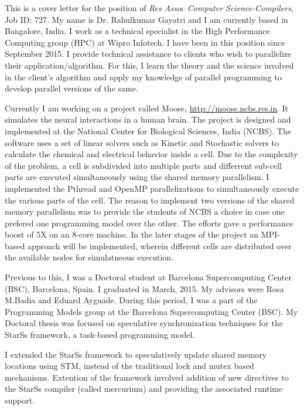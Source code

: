\documentclass[10pt,stdletter,dateno]{newlfm}
\begin{document}
\begin{newlfm}
	   This is a cover letter for the position of {\it Res Assoc Computer Science-Compilers}, Job ID: 727. 
	   My name is Dr. Rahulkumar Gayatri and I am currently based in Bangalore, India. 
	   I work as a technical specialist in the High Performance Computing group (HPC) at Wipro Infotech. 
	   I have been in this position since September 2015. 
	   I provide technical assistance to clients who wish to parallelize their application/algorithm.
	   For this, I learn the theory and the science involved in the client's algorithm and apply my knowledge of parallel programming to develop parallel versions of the same.
%	   
	   \par
	   Currently I am working on a project called Moose, \href{url}{http://moose.ncbs.res.in}.
	   It simulates the neural interactions in a human brain. 
	   The project is designed and implemented at the National Center for Biological Sciences, India (NCBS). 
	   The software uses a set of linear solvers such as Kinetic and Stochastic solvers to calculate the chemical and electrical behavior inside a cell. 
	   Due to the complexity of the problem, a cell is subdivided into multiple parts and differrent sub-cell parts are executed simultaneously using the shared memory parallelism. 
	   I implemented the Pthread and OpenMP parallelizations to simultaneously execute the various parts of the cell. 
	   The reason to implement two versions of the shared memory parallelism was to provide the students of NCBS a choice in case one prefered one programming model over the other.
	   The efforts gave a performance boost of 5X on an 8-core machine.
	   In the later stages of the project an MPI-based approach will be implemented, wherein different cells are distributed over the available nodes for simulatneous execution.
%	   
	   \par
	   Previous to this, I was a Doctoral student at Barcelona Supercomputing Center (BSC), Barcelona, Spain. I graduated in March, 2015. 
	   My advisors were Rosa M.Badia and Eduard Ayguade.  
	   During this period, I was a part of the Programming Models group at the Barcelona Supercomputing Center (BSC). 
	   My Doctoral thesis was focused on speculative synchronization techniques for the StarSs framework, a task-based programming model.
%
	   \par
	   I extended the StarSs framework to speculatively update shared memory locations using STM, instead of the traditional lock and mutex based mechanisms.
	   Extention of the framework involved addition of new directives to the StarSs compiler (called mercurium) and providing the associated runtime support.

\end{newlfm}
\end{document}
